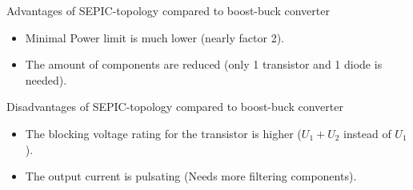 

\begin{solutionblock}
    Advantages of SEPIC-topology compared to boost-buck converter
    \begin{itemize}
        \item Minimal Power limit is much lower (nearly factor 2).
        \item The amount of components are reduced (only 1 transistor and 1 diode is needed).
    \end{itemize}  
    Disadvantages of SEPIC-topology compared to boost-buck converter
    \begin{itemize}
        \item The blocking voltage rating for the transistor is higher ($U_\mathrm{1}+U_\mathrm{2}$ instead of $U_\mathrm{1}$).
        \item The output current is pulsating (Needs more filtering components).
    \end{itemize}  
\end{solutionblock}
